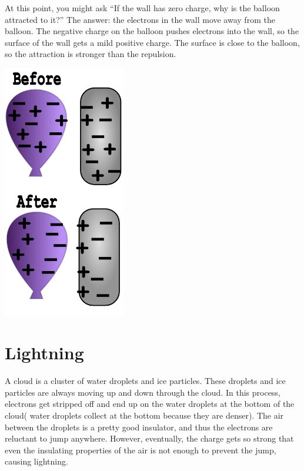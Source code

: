 At this point, you might ask ``If the wall has zero
charge, why is the balloon attracted to it?'' The answer: the
electrons in the wall move away from the balloon. The negative charge
on the balloon pushes electrons into the wall, so the surface of the
wall gets a mild positive charge. The surface is close to the balloon,
so the attraction is stronger than the repulsion.

\includegraphics[width=0.4\textwidth]{Ballon_Diagram.png}

\section{Lightning}

A cloud is a cluster of water droplets and ice particles. These
droplets and ice particles are always moving up and down through the
cloud. In this process, electrons get stripped off and end up on the
water droplets at the bottom of the cloud( water droplets collect at the bottom because they are denser). The air between the
droplets is a pretty good insulator, and thus the electrons are reluctant
to jump anywhere. However, eventually, the charge gets so strong that
even the insulating properties of the air is not enough to prevent
the jump, causing lightning.

